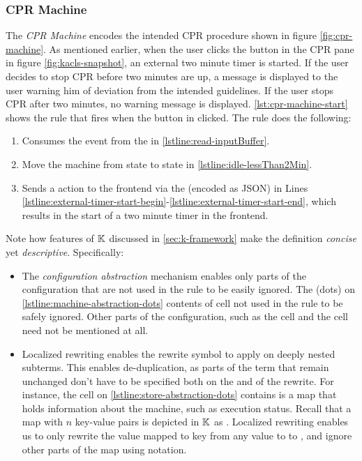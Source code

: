 \subsubsection{CPR Machine}

The \textit{CPR Machine} encodes the intended CPR procedure
shown in figure \ref{fig:cpr-machine}. As mentioned earlier, when the user clicks
the  button in the CPR pane in figure \ref{fig:kacls-snapshot},
an external two minute timer is started. If the user decides to stop CPR before
two minutes are up, a message is displayed to the user warning him of
deviation from the intended guidelines. If the user stops CPR after
two minutes, no warning message is displayed.
\autoref{lst:cpr-machine-start} shows the rule that
fires when the  button in clicked.
The rule does the following:
\begin{enumerate}[label=(\alph*)]
  \item Consumes the  event from the  in
    \autoref{lstline:read-inputBuffer}.
  \item Move the machine from state  to state 
    in \autoref{lstline:idle-lessThan2Min}.
  \item Sends a  action to the frontend via the
     (encoded as JSON) in
    Lines \ref{lstline:external-timer-start-begin}-\ref{lstline:external-timer-start-end},
    which results in the start of a two minute timer in the frontend.
\end{enumerate}
Note how features of $\mathbb{K}$ discussed in \autoref{sec:k-framework}
make the definition \emph{concise} yet \emph{descriptive}. Specifically:
\begin{itemize}
  \item The \emph{configuration abstraction} mechanism enables only parts of the
  configuration that are not used in the rule to be easily ignored.
    The  (dots) on
    \autoref{lstline:machine-abstraction-dots} contents of cell
    not used in the rule to be safely ignored. Other parts
    of the configuration, such as the  cell
    and the  cell need not be mentioned at all.
  \item Localized rewriting enables the rewrite symbol \inlinek{=>} to
    apply on deeply nested subterms. This enables de-duplication,
    as parts of the term that remain unchanged don't have to be
    specified both on the \LHS{} and \RHS{} of the rewrite. For instance,
    the  cell on \autoref{lstline:store-abstraction-dots}
    contains is a map that holds information about the machine, such as
    execution status. Recall that a map with $n$ key-value pairs is
    depicted in $\mathbb{K}$ as
    . Localized rewriting enables us to only rewrite the
    value mapped to key  from any value to
    to \inlinek{true}, and ignore other parts of the map using 
    notation.
\end{itemize}
